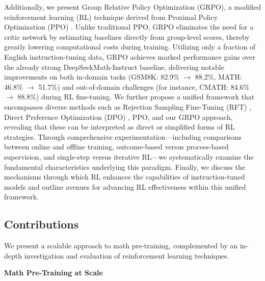 Additionally, we present Group Relative Policy Optimization (GRPO), a modified reinforcement learning (RL) technique derived from Proximal Policy Optimization (PPO) \citep{schulman2017proximal}. Unlike traditional PPO, GRPO eliminates the need for a critic network by estimating baselines directly from group-level scores, thereby greatly lowering computational costs during training. Utilizing only a fraction of English instruction-tuning data, GRPO achieves marked performance gains over the already strong DeepSeekMath-Instruct baseline, delivering notable improvements on both in-domain tasks (GSM8K: 82.9\% $\rightarrow$ 88.2\%, MATH: 46.8\% $\rightarrow$ 51.7\%) and out-of-domain challenges (for instance, CMATH: 84.6\% $\rightarrow$ 88.8\%) during RL fine-tuning. We further propose a unified framework that encompasses diverse methods such as Rejection Sampling Fine-Tuning (RFT) \citep{yuan2023scaling}, Direct Preference Optimization (DPO) \citep{dpo}, PPO, and our GRPO approach, revealing that these can be interpreted as direct or simplified forms of RL strategies. Through comprehensive experimentation—including comparisons between online and offline training, outcome-based versus process-based supervision, and single-step versus iterative RL—we systematically examine the fundamental characteristics underlying this paradigm. Finally, we discuss the mechanisms through which RL enhances the capabilities of instruction-tuned models and outline avenues for advancing RL effectiveness within this unified framework.

\subsection{Contributions}
We present a scalable approach to math pre-training, complemented by an in-depth investigation and evaluation of reinforcement learning techniques.

\textbf{Math Pre-Training at Scale}

